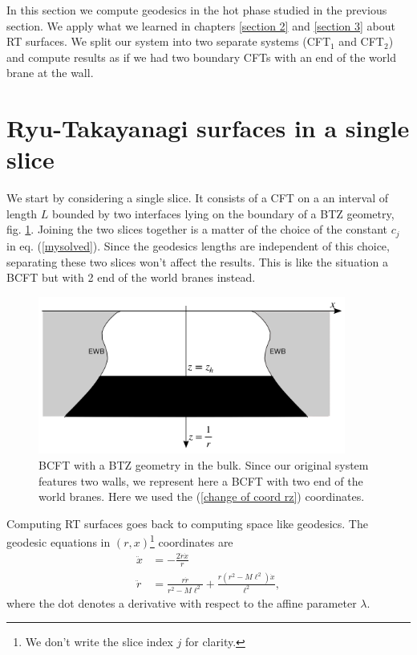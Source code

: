 In this section we compute geodesics in the hot phase studied in the previous section. We apply what we learned in chapters \ref{section 2} and \ref{section 3} about RT surfaces. We split our system into two separate systems (CFT$_1$ and CFT$_2$) and compute results as if we had two boundary CFTs with an end of the world brane at the wall\cite{chu2021page}.

\section{Ryu-Takayanagi surfaces in a single slice}

We start by considering a single slice. It consists of a CFT on a an interval of length $L$ bounded by two interfaces lying on the boundary of a BTZ geometry, fig. \ref{BCFT}. Joining the two slices together is a matter of the choice of the constant $c_j$ in eq. (\ref{mysolved}). Since the geodesics lengths are independent of this choice, separating these two slices won't affect the results. This is like the situation a BCFT \cite{chu2021page} but with 2 end of the world branes instead.

\begin{figure}
    \centering
    \includegraphics[width=0.9\textwidth]{figures/BCFT.png}
    \caption{BCFT with a BTZ geometry in the bulk. Since our original system features two walls, we represent here a BCFT with two end of the world branes. Here we used the (\ref{change of coord rz}) coordinates.}
    \label{BCFT}
\end{figure}

Computing RT surfaces goes back to computing space like geodesics. The geodesic equations in $(r,x)$\footnote{We don't write the slice index $j$ for clarity.} coordinates are
\begin{subequations}
    \label{geodesic equations}
    \begin{align}
        \ddot x &= -\frac{2\dot r\dot x}{r}\label{geodesic 1}\\
        \ddot r &= \frac{r\dot r}{r^2-M\ell^2} + \frac{r(r^2-M\ell^2)\dot x}{\ell^2},\label{geodesic 2}
    \end{align}
\end{subequations}
where the dot denotes a derivative with respect to the affine parameter $\lambda$.


